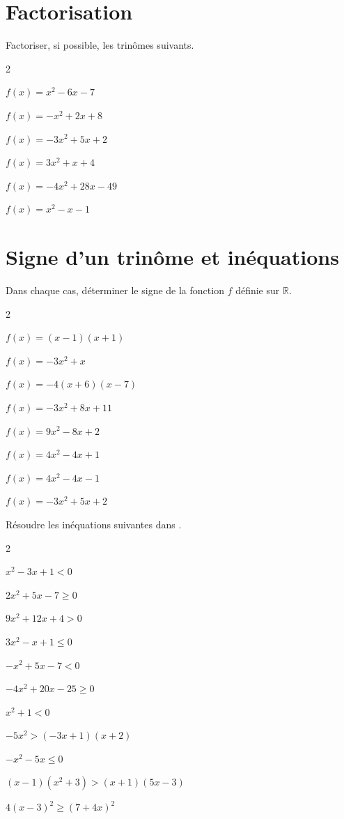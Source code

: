 \documentclass[11pt,a4paper]{article}  %
\begin{document}
\section*{Factorisation}

\exercice{}

Factoriser, si possible, les trinômes suivants.
\begin{multicols}{2}
\begin{enumMet}
	\item $f(x)=x^2-6 x-7$
	\item $f(x)=-x^2+2 x+8$
	\item $f(x)=-3 x^2+5 x+2$
	\item $f(x)=3 x^2+x+4$
	\item $f(x)=-4 x^2+28 x-49$
	\item $f(x)=x^2-x-1$
\end{enumMet}
\end{multicols}

\section*{Signe d'un trinôme et inéquations}

\exercice{}

Dans chaque cas, déterminer le signe de la fonction $f$ définie sur $\mathbb{R}$.
\begin{multicols}{2}
\begin{enumMet}
	\item $f(x)=(x-1)(x+1)$
	\item $f(x)=-3 x^2+x$
	\item $f(x)=-4(x+6)(x-7)$
	\item $f(x)=-3 x^2+8 x+11$
	\item $f(x)=9 x^2-8 x+2$
	\item $f(x)=4 x^2-4 x+1$
	\item $f(x)=4 x^2-4 x-1$
	\item $f(x)=-3 x^2+5 x+2$
\end{enumMet}
\end{multicols}


\exercice{}

Résoudre les inéquations suivantes dans \R.
\begin{multicols}{2}
	\begin{enumMet}
		\item $x^2-3 x+1<0$
		\item $2 x^2+5 x-7 \geqslant 0$
		\item $9 x^2+12 x+4>0$
		\item $3 x^2-x+1 \leqslant 0$
		\item $-x^2+5 x-7<0$
		\item $-4 x^2+20 x-25 \geqslant 0$
		\item $x^2+1<0$
		\item $-5 x^2>(-3 x+1)(x+2)$
		\item $-x^2-5 x \leqslant 0$
		\item $(x-1)\left(x^2+3\right)>(x+1)(5 x-3)$
		\item $4(x-3)^2 \geqslant(7+4 x)^2$
	\end{enumMet}
\end{multicols}
\end{document}
